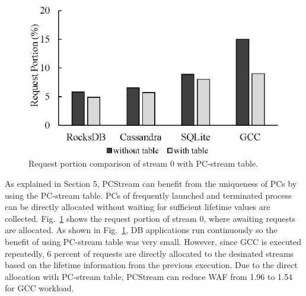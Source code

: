 \begin{figure}[t]
	\centering
	\includegraphics[width=0.7\linewidth]{figure/pctable}
	\caption{Request portion comparison of stream 0 with PC-stream table.}
	\label{fig:pctable}
\end{figure}

As explained in Section 5, PCStream can benefit from the uniqueness of PCs
by using the PC-stream table.
PCs of frequently launched and terminated process can be directly allocated without
waiting for sufficient lifetime values are collected.
Fig.~\ref{fig:pctable} shows the request portion of stream 0, where 
awaiting requests are allocated.
As shown in Fig.~\ref{fig:pctable}, DB applications run 
continuously so the benefit of using PC-stream table was very small. 
However, since GCC is executed repeatedly, 6 percent of requests are directly
allocated to the desinated streams based on the lifetime information from the 
previous execution. 
Due to the direct allocation with PC-stream table, PCStream can 
reduce WAF from 1.96 to 1.54 for GCC workload.


